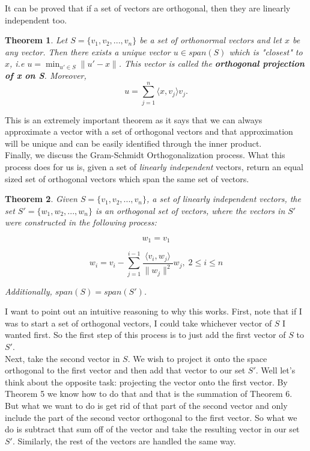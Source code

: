 \documentclass[11pt,a4paper]{report}
\theoremstyle{plain}
\newtheorem{thm}{Theorem}
\theoremstyle{definition}
\begin{document}
It can be proved that if a set of vectors are orthogonal, then they are linearly independent too. \\

\begin{thm} Let $S = \{v_1, v_2,...,v_n\}$ be a set of orthonormal vectors and let $x$ be any vector. Then there exists a unique vector $u \in span(S)$ which is "closest" to $x$, i.e $u = \displaystyle \min_{u' \in S} \|u' - x\|$. This vector is called the \textbf{\textit{orthogonal projection of x on S}}. Moreover,
$$u = \sum_{j=1}^{n}\langle x,v_j \rangle v_j.$$
\end{thm}

This is an extremely important theorem as it says that we can always approximate a vector with a set of orthogonal vectors and that approximation will be unique and can be easily identified through the inner product. \\

Finally, we discuss the Gram-Schmidt Orthogonalization process. What this process does for us is, given a set of \textit{linearly independent} vectors, return an equal sized set of orthogonal vectors which span the same set of vectors. 

\begin{thm}
Given $S = \{v_1, v_2,...,v_n\}$, a set of linearly independent vectors, the set $S' = \{w_1, w_2,...,w_n\}$ is an orthogonal set of vectors, where the vectors in $S'$ were constructed in the following process:

$$w_1 = v_1$$

$$w_i = v_i - \sum_{j=1}^{i-1} \frac{\langle v_i,w_j \rangle}{\|w_j\|^2}w_j,\; 2\leq i \leq n$$

Additionally, $span(S) = span(S')$.
\end{thm}

I want to point out an intuitive reasoning to why this works. First, note that if I was to start a set of orthogonal vectors, I could take whichever vector of $S$ I wanted first. So the first step of this process is to just add the first vector of $S$ to $S'$. \\

Next, take the second vector in $S$. We wish to project it onto the space orthogonal to the first vector and then add that vector to our set $S'$. Well let's think about the opposite task: projecting the vector onto the first vector. By Theorem 5 we know how to do that and that is the summation of  Theorem 6. But what we want to do is get rid of that part of the second vector and only include the part of the second vector orthogonal to the first vector. So what we do is subtract that sum off of the vector and take the resulting vector in our set $S'$. Similarly, the rest of the vectors are handled the same way. \\
\end{document}
